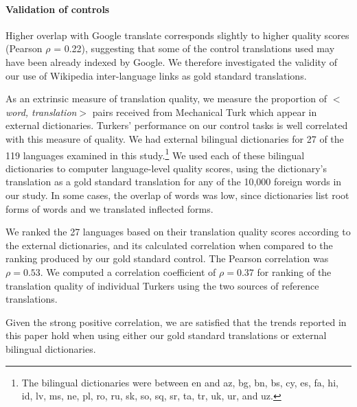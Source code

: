 \documentclass[11pt]{article}
\begin{document}

\paragraph{Validation of controls} 
Higher overlap with Google translate corresponds slightly to higher quality scores (Pearson $\rho$ = 0.22), suggesting that some of the control translations used may have been already indexed by Google. We therefore investigated the validity of our use of Wikipedia inter-language links as gold standard translations.

As an extrinsic measure of translation quality, we measure the proportion of $<${\it word, translation}$>$ pairs received from Mechanical Turk which appear in external dictionaries. Turkers' performance on our control tasks is well correlated with this measure of quality.    We had external bilingual dictionaries for 27 of the 119 languages examined in this study.\footnote{The bilingual dictionaries were between en and az, bg, bn, bs, cy, es, fa, hi, id, lv, ms, ne, pl, ro, ru, sk, so, sq, sr, ta, tr, uk, ur, and uz. }  We used each of these bilingual dictionaries to computer language-level quality scores, using the dictionary's translation as a gold standard translation for any of the 10,000 foreign words in our study.  In some cases, the overlap of words was low, since dictionaries list root forms of words and we translated inflected forms.  

We ranked the 27 languages based on their translation quality scores according to the external dictionaries, and its calculated correlation when compared to the ranking produced by our gold standard control.  The Pearson correlation was $\rho=0.53$.  We computed a correlation coefficient of $\rho=0.37$ for ranking of the translation quality of individual Turkers using the two sources of reference translations.    

Given the strong positive correlation, we are satisfied that the trends reported in this paper hold when using either our gold standard translations or external bilingual dictionaries. 
\end{document}
